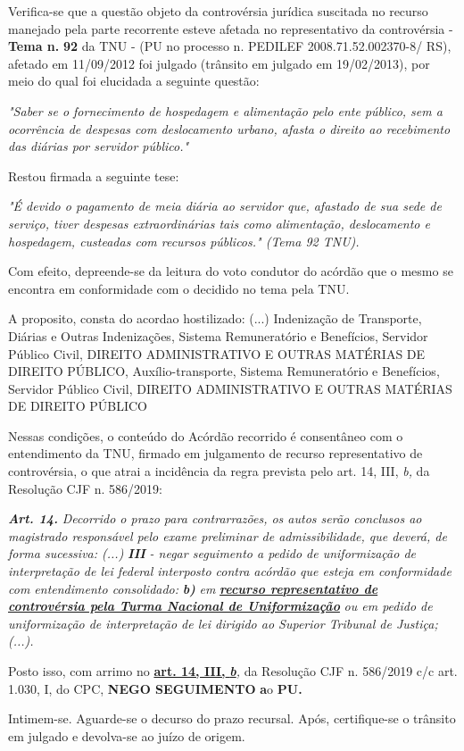 \documentclass[12pt]{article}
\begin{document}
\justifying
\noindent Verifica-se que a questão objeto da controvérsia jurídica suscitada no recurso manejado pela parte recorrente esteve afetada no representativo da controvérsia - \textbf{Tema n. }\textbf{92} da TNU - (PU no processo n. PEDILEF 2008.71.52.002370-8/ RS),  afetado em 11/09/2012 foi julgado (trânsito em julgado em 19/02/2013), por meio do qual foi elucidada a seguinte questão:

\noindent \textit{"Saber se o fornecimento de hospedagem e alimentação pelo ente público, sem a ocorrência de despesas com deslocamento urbano, afasta o direito ao recebimento das diárias por servidor público."}

\noindent Restou firmada a seguinte tese:

\noindent \textit{"É devido o pagamento de meia diária ao servidor que, afastado de sua sede de serviço, tiver despesas extraordinárias tais como alimentação, deslocamento e hospedagem, custeadas com recursos públicos." (Tema 92 TNU).}

\noindent Com efeito, depreende-se da leitura do voto condutor do acórdão que o mesmo se encontra em conformidade com o decidido no  tema pela TNU.

\noindent A proposito, consta do acordao hostilizado: (...) Indenização de Transporte, Diárias e Outras Indenizações, Sistema Remuneratório e Benefícios, Servidor Público Civil, DIREITO ADMINISTRATIVO E OUTRAS MATÉRIAS DE DIREITO PÚBLICO, Auxílio-transporte, Sistema Remuneratório e Benefícios, Servidor Público Civil, DIREITO ADMINISTRATIVO E OUTRAS MATÉRIAS DE DIREITO PÚBLICO

\noindent Nessas condições, o conteúdo do Acórdão recorrido é consentâneo com o entendimento da TNU, firmado em julgamento de recurso representativo de controvérsia, o que atrai a incidência da regra prevista pelo art. 14, III, \textit{b,} da Resolução CJF n. 586/2019:

\noindent \textit{\textbf{Art. 14.}}\textit{ Decorrido o prazo para contrarrazões, os autos serão conclusos ao magistrado responsável pelo exame preliminar de admissibilidade, que deverá, de forma sucessiva: (...) }\textit{\textbf{III }}\textit{- negar seguimento a pedido de uniformização de interpretação de lei federal interposto contra acórdão que esteja em conformidade com entendimento consolidado: }\textit{\textbf{b)}}\textit{ em }\uline{\textit{\textbf{recurso representativo de controvérsia pela Turma Nacional de Uniformização}}}\textit{ ou em pedido de uniformização de interpretação de lei dirigido ao Superior Tribunal de Justiça;(...).}

\noindent Posto isso, com arrimo no \uline{\textbf{art. 14, III, }}\uline{\textit{\textbf{b}}}\textit{,} da Resolução CJF n. 586/2019 c/c art. 1.030, I, do CPC, \textbf{NEGO SEGUIMENTO }\textbf{a}o\textbf{ PU}\textbf{.}

\noindent Intimem-se. Aguarde-se o decurso do prazo recursal. Após, certifique-se o trânsito em julgado e devolva-se ao juízo de origem.
\end{document}
